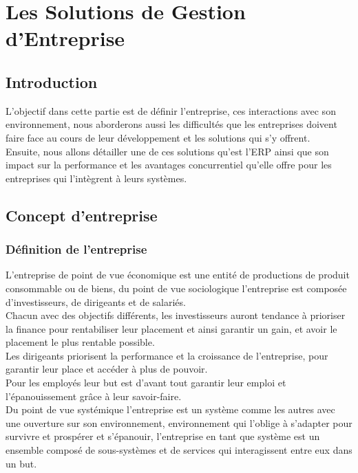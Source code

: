 \chapter{Les Solutions de Gestion d'Entreprise}

\section{Introduction}
    L’objectif dans cette partie est de définir l’entreprise, ces interactions avec son 
    environnement, nous aborderons aussi les difficultés que les entreprises doivent faire face au cours de leur développement et les solutions qui s’y offrent.\\

    Ensuite, nous allons détailler une de ces solutions qu’est l’ERP ainsi que son impact sur la performance et les avantages concurrentiel qu’elle offre pour les entreprises qui l’intègrent à 
    leurs systèmes.\\

\section{Concept d’entreprise}
    \subsection{Définition de l’entreprise \cite{onou}}
        L’entreprise de point de vue économique est une entité de productions de produit 
        consommable ou de biens, du point de vue sociologique l’entreprise est composée 
        d’investisseurs, de dirigeants et de salariés.\\

        Chacun avec des objectifs différents, les investisseurs auront tendance à prioriser la finance pour rentabiliser leur placement et ainsi garantir un gain, et avoir le placement le plus rentable possible.\\

        Les dirigeants priorisent la performance et la croissance de l’entreprise, pour garantir leur place et accéder à plus de pouvoir.\\

        Pour les employés leur but est d’avant tout garantir leur emploi et l’épanouissement grâce à leur savoir-faire.\\

        Du point de vue systémique l’entreprise est un système comme les autres avec une ouverture sur son environnement, environnement qui l’oblige à s’adapter pour survivre et prospérer et s’épanouir, l’entreprise en tant que système est un ensemble composé de sous-systèmes et de services qui interagissent entre eux dans un but.\\

